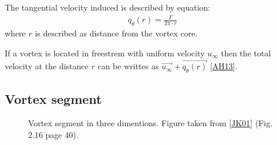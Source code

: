 \documentclass[letterpaper,10pt,english]{jupyterBook}
\begin{document}
\sphinxAtStartPar
The tangential velocity induced is described by equation:
\begin{equation*}
\begin{split}
q_\theta(r) = \frac{\Gamma}{2\pi \cdot r}
\end{split}
\end{equation*}
\sphinxAtStartPar
where \(r\) is described as distance from the vortex core.

\sphinxAtStartPar
If a vortex is located in free\sphinxhyphen{}strem with uniform velocity \(u_\infty\) then the total velocity at the distance \(r\) can be writtes as \(\overrightarrow{u_\infty} + \overrightarrow{q_\theta(r)}\) {[}\hyperlink{cite.chapters/bibliography:id2}{AH13}{]}.


\subsection{Vortex segment}
\label{\detokenize{chapters/description/theory:vortex-segment}}
\begin{figure}[htbp]
\centering
\capstart

\noindent{}
\caption{Vortex segment in three dimentions. Figure taken from {[}\hyperlink{cite.chapters/bibliography:id3}{JK01}{]} (Fig. 2.16 page 40).}\label{\detokenize{chapters/description/theory:id10}}\end{figure}
\end{document}

